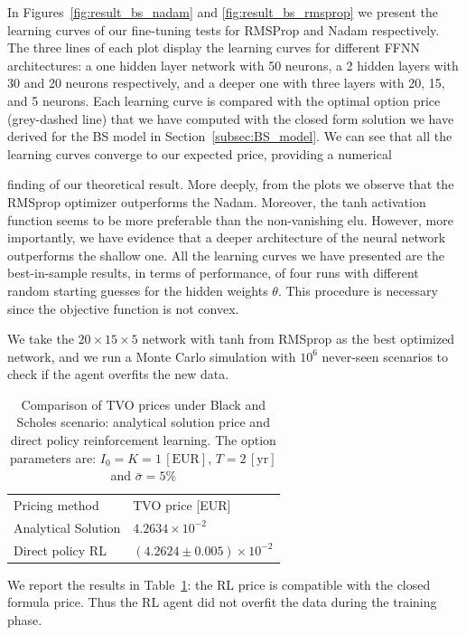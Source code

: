 \documentclass[runningheads]{m2ef}
\newcommand\soutpars[1]{\let\helpcmd\sout\parhelp#1\par\relax\relax}
\newcommand{\change}[1]{{\color{red} {#1}}}%
\newcommand{\remove}[1]{{\color{red} \soutpars{{#1}}}}%
\begin{document}
	In Figures~\ref{fig:result_bs_nadam} and \ref{fig:result_bs_rmsprop} we present the learning curves of our fine-tuning tests for RMSProp and Nadam respectively. The three lines of each plot display the learning curves for different FFNN architectures: a one hidden layer network with 50 neurons, a 2 hidden layers with 30 and 20 neurons respectively, and a deeper one with three layers with 20, 15, and 5 neurons. Each learning curve is compared with the optimal option price (grey-dashed line) that we have computed with the closed form solution we have derived for the BS model in Section~\ref{subsec:BS_model}. We can see that all the learning curves converge to our expected price, providing a numerical \remove{demonstration} \change{finding} of our theoretical result. More deeply, from the plots we observe that the RMSprop optimizer outperforms the Nadam. Moreover, the tanh activation function seems to be more preferable than the non-vanishing elu. However, more importantly, we have evidence that a deeper architecture of the neural network outperforms the shallow one. All the learning curves we have presented are the best-in-sample results, in terms of performance, of four runs with different random starting guesses for the hidden weights $\theta$. This procedure is necessary since the objective function is not convex.

	We take the $20\times 15 \times 5$ network with tanh from RMSprop as the best optimized network, and we run a Monte Carlo simulation with $10^6$ never-seen scenarios to check if the agent overfits the new data. 
	\begin{table}
	\begin{center}
	\caption{Comparison of TVO prices under Black and Scholes \change{scenario}: analytical solution price and direct policy reinforcement learning. The option parameters are: $I_0=K=1\,[\text{EUR}]$, $T=2\,[\text{yr}]$ and $\bar{\sigma}=5\%$}
	\label{tab:mc_results_bs}
	\begin{tabular}{ll}
	\hline\noalign{\smallskip}
	Pricing method & TVO price [EUR] \\
	\noalign{\smallskip}
	\hline
	\noalign{\smallskip}
	Analytical Solution & $4.2634\times 10^{-2}$ \\
	Direct policy RL & $(4.2624 \pm 0.005) \times 10^{-2}$ \\ 
	\hline
	\end{tabular}
	\end{center}
	\end{table}
	\setlength{\tabcolsep}{1.4pt}
	We report the results in Table~\ref{tab:mc_results_bs}: the RL price is compatible with the closed formula price. Thus the RL agent did not overfit the data during the training phase.
\end{document}
